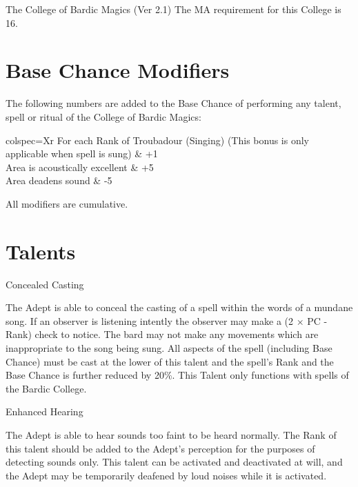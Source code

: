 \begin{Chapter}{The College of Bardic Magics (Ver 2.1)}
The MA requirement for this College is 16. 

\section{Base Chance Modifiers}

The following numbers are added to the Base Chance of performing any
talent, spell or ritual of the College of Bardic Magics:

\begin{dqtblr}{colspec={Xr}}
For each Rank of Troubadour (Singing) (This bonus is only applicable when spell is sung)	& +1 \\
Area is acoustically excellent	& +5 \\
Area deadens sound		& -5 \\
\end{dqtblr}

All modifiers are cumulative. 

\section{Talents}

\begin{talent}[T-1]{Concealed Casting}

\begin{effects}
The Adept is able to conceal the casting of a spell within the words
of a mundane song.  If an observer is listening intently the observer
may make a (2 × PC - Rank) check to notice. The bard may not make any
movements which are inappropriate to the song being sung.  All aspects
of the spell (including Base Chance) must be cast at the lower of this
talent and the spell’s Rank and the Base Chance is further reduced by
20\%. This Talent only functions with spells of the Bardic College.
\end{effects}
\end{talent}

\begin{talent}[T-2]{Enhanced Hearing}

\begin{effects}
The Adept is able to hear sounds too faint to be heard normally.  The
Rank of this talent should be added to the Adept’s perception for the
purposes of detecting sounds only.  This talent can be activated and
deactivated at will, and the Adept may be temporarily deafened by loud
noises while it is activated.
\end{effects}
\end{talent}



\end{Chapter}
